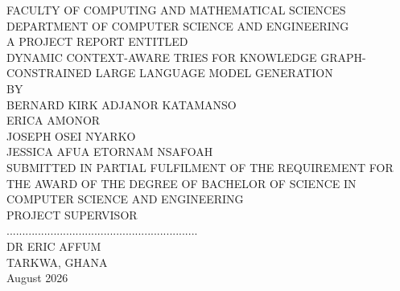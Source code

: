 \documentclass[12pt, onehalfspacing, liststotoc, oneside, parskip, headsepline,UKenglish]{UMaT_Undergrauate_Report_Template_Configurations}
\author{Your Full Name}
\begin{document}
\frontmatter

\pagestyle{plain}


\begin{titlepage}
  \large
  \begin{center}

    {\scshape \univname\par}\vspace{0cm}

    { FACULTY OF  COMPUTING AND MATHEMATICAL SCIENCES}\\[0.02cm]

    {  DEPARTMENT OF COMPUTER SCIENCE AND ENGINEERING }\\[0.8cm]

    \vspace{0.2cm}
    {  A PROJECT REPORT ENTITLED }\\[0.1cm]
    {  DYNAMIC CONTEXT-AWARE TRIES FOR KNOWLEDGE GRAPH-CONSTRAINED LARGE LANGUAGE MODEL GENERATION}\\[1cm]

    {  BY}\\
    { BERNARD KIRK ADJANOR KATAMANSO}\\
    { ERICA AMONOR}\\
    { JOSEPH OSEI NYARKO}\\
    { JESSICA AFUA ETORNAM NSAFOAH}\\[1.2cm]

    {  SUBMITTED IN PARTIAL FULFILMENT OF THE REQUIREMENT FOR THE AWARD OF THE DEGREE OF BACHELOR OF SCIENCE IN COMPUTER SCIENCE AND ENGINEERING }\\[1.2cm]

    {  PROJECT SUPERVISOR}\\[0.3cm]

    .............................................................\\

    {  DR ERIC AFFUM}\\[0.6cm]
    {  TARKWA, GHANA\\ August 2026}

  \end{center}
\end{titlepage}
\end{document}
